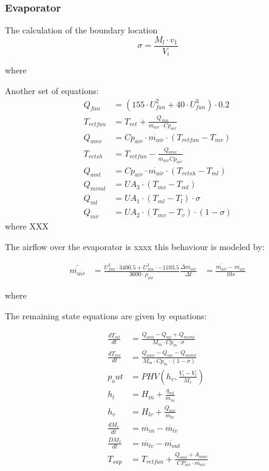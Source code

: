 \subsubsection{Evaporator}

The calculation of the boundary location 
\begin{equation}
	\sigma = \frac{M_l \cdot v_1}{V_i}
\end{equation}

where


Another set of equations:
\begin{align}
	Q_{fan} 		& = (155 \cdot U_{fan}^2 + 40 \cdot U_{fan}^3) \cdot 0.2 \\
	T_{retfan} 		& = T_{ret} + \frac{Q_{fan}}{\dot{m_{air}} \cdot Cp_{air}} \\
	Q_{amv} 		& = Cp_{air} \cdot \dot{m_{air}} \cdot (T_{retfan} - T_{mv}) \\
	T_{retsh} 		& = T_{retfan} - \frac{Q_{amv}}{\dot{m_{air}} \dot Cp_{air}} \\
	Q_{aml} 		& = Cp_{air} \cdot \dot{m_{air}} \cdot (T_{retsh} - T_{ml}) \\
	Q_{mvml} 		& = U A_3 \cdot (T_{mv} - T_{ml}) \\
	Q_{ml} 			& = U A_1 \cdot (T_{ml} - T_l) \cdot \sigma\\
	Q_{mv} 			& = U A_2 \cdot (T_{mv} - T_v) \cdot (1- \sigma)
\end{align}
where
XXX

The airflow over the evaporator is xxxx this behaviour is modeled by:

\begin{align}
	\bar{\dot{m_{air}}} & = \frac{U_{fan}^2 \cdot 3400.5 + U_{fan}^3 \cdot -1103.5} {3600 \cdot \rho_{air}}
	\frac{\Delta \dot{m_{air}}}{\Delta t} & = \frac{\bar{\dot{m_{air}}} - \dot{m_{air}}} {10s}
\end{align}

where

The remaining state equations are given by equations:

\begin{align}
	\frac{dT_{ml}}{dt} & = \frac{Q_{aml}-Q_{ml} + Q_{mvml}}{M_m \cdot Cp_m \cdot \sigma} \\
	\frac{dT_{mv}}{dt} & = \frac{Q_{amv} - Q_{mv} - Q_{mvml}}{M_m \cdot Cp_m \cdot (1- \sigma)} \\
	p_out & = PHV \left( h_v, \frac{V_i-V_l}{M_v} \right)\\
	h_l & = H_{in} + \frac{q_{ml}}{\dot{m_{in}}}\\
	h_v & = H_{lv} + \frac{Q_{mv}}{\dot{m_{lv}}}\\
	\frac{dM_l}{dt} & = \dot{m_{in}} - \dot{m_{lv}}\\
	\frac{DM_v}{dt} & = \dot{m_{lv}} - \dot{m_{out}}\\
	T_{sup} & = T_{retfan} +  \frac{Q_{aml} + A_{amv}}{CP_{air} \cdot \dot{m_{air}}}
\end{align}

